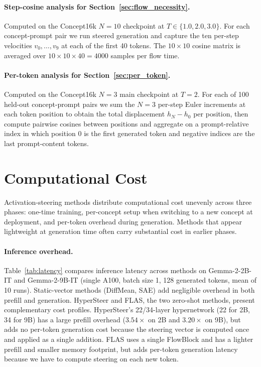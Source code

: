\documentclass{article}
\begin{document}
\paragraph{Step-cosine analysis for Section~\ref{sec:flow_necessity}.}
Computed on the Concept16k $N\!=\!10$ checkpoint at $T \in \{1.0, 2.0, 3.0\}$. For each concept-prompt pair we run steered generation and capture the ten per-step velocities $v_0, \ldots, v_9$ at each of the first 40 tokens. The $10\!\times\!10$ cosine matrix is averaged over $10\!\times\!10\!\times\!40 = 4000$ samples per flow time.

\paragraph{Per-token analysis for Section~\ref{sec:per_token}.}
Computed on the Concept16k $N\!=\!3$ main checkpoint at $T\!=\!2$. For each of 100 held-out concept-prompt pairs we sum the $N\!=\!3$ per-step Euler increments at each token position to obtain the total displacement $h_N - h_0$ per position, then compute pairwise cosines between positions and aggregate on a prompt-relative index in which position $0$ is the first generated token and negative indices are the last prompt-content tokens.

\section{Computational Cost}
\label{app:cost}

Activation-steering methods distribute computational cost unevenly across three phases: one-time training, per-concept setup when switching to a new concept at deployment, and per-token overhead during generation. Methods that appear lightweight at generation time often carry substantial cost in earlier phases.

\paragraph{Inference overhead.}
Table~\ref{tab:latency} compares inference latency across methods on Gemma-2-2B-IT and Gemma-2-9B-IT (single A100, batch size 1, 128 generated tokens, mean of 10 runs). Static-vector methods (DiffMean, SAE) add negligible overhead in both prefill and generation. HyperSteer and FLAS, the two zero-shot methods, present complementary cost profiles. HyperSteer's 22/34-layer hypernetwork (22 for 2B, 34 for 9B) has a large prefill overhead ($3.54\times$ on 2B and $3.20\times$ on 9B), but adds no per-token generation cost because the steering vector is computed once and applied as a single addition. FLAS uses a single FlowBlock and has a lighter prefill and smaller memory footprint, but adds per-token generation latency because we have to compute steering on each new token.
\end{document}
